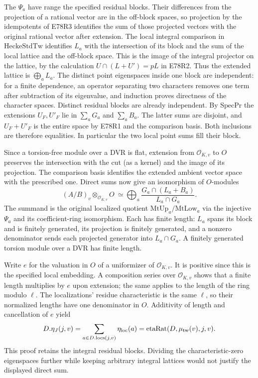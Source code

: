 The $\Psi_a$ have range the specified residual blocks. Their
differences from the projection of a rational vector are in the
off-block spaces, so projection by the idempotents of E78R3 identifies
the sum of those projected vectors with the original rational vector
after extension. The local integral comparison in
$\mathrm{HeckeStdTw}$ identifies $L_a$ with the intersection of its block
and the sum of the local lattice and the off-block space. This is the image of
the integral projector on the lattice, by the calculation
$U\cap(L+U')=pL$ in E78R2. Thus the extended lattice is
$\bigoplus_a L_a$. The distinct point eigenspaces inside one block
are independent: for a finite dependence, an operator separating
two characters removes one term after subtraction of its eigenvalue,
and induction proves directness of the character spaces. Distinct
residual blocks are already independent. By $\mathrm{SpecPr}$ the
extensions $U_F,U'_F$ lie in $\sum_a G_a$ and $\sum_a B_a$.
The latter sums are disjoint, and $U_F+U'_F$ is the entire space
by E78R1 and the comparison basis. Both inclusions are therefore
equalities. In particular the two local point sums fill their block.

Since a torsion-free module over a DVR is flat, extension from
$\mathcal O_{K,v}$ to $O$ preserves the intersection with the cut
(as a kernel) and the image of its projection. The comparison basis
identifies the extended ambient vector space with the prescribed
one. Direct sums now give an isomorphism of $O$-modules
\[
 (A/B)_v\otimes_{\mathcal O_{K,v}}O\ \simeq \bigoplus_a \frac{G_a\cap(L_a+B_a)}{L_a\cap G_a}.
\]
The summand is the original localized quotient
$\mathrm{MtUp}_a/\mathrm{MtLow}_a$ via the injective $\Psi_a$ and
its coefficient-ring isomorphism. Each has finite length: $L_a$
spans its block and is finitely generated, its projection is finitely
generated, and a nonzero denominator sends each projected generator
into $L_a\cap G_a$. A finitely generated torsion module over a DVR
has finite length.

Write $e$ for the valuation in $O$ of a uniformizer of
$\mathcal O_{K,v}$. It is positive since this is the specified local
embedding. A composition series over $\mathcal O_{K,v}$ shows that
a finite length multiplies by $e$ upon extension; the same applies
to the length of the ring modulo $\ell$. The localizations' residue
characteristic is the same $\ell$, so their normalized lengths have
one denominator in $O$. Additivity of length and cancellation of $e$
yield
\[
 D.\eta_J(j,v)=\sum_{a\in D.\mathrm{locs}(j,v)}\eta_{\rm loc}(a)
 =\mathrm{etaRat}(D,\mu_{\rm tw}(v),j,v).
\]
This proof retains the integral residual blocks. Dividing the
characteristic-zero eigenspaces further while keeping arbitrary
integral lattices would not justify the displayed direct sum.

